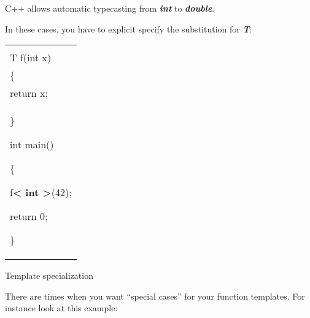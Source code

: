 \documentclass[
]{article}
\begin{document}
C++ allows automatic typecasting from \emph{\textbf{int}} to
\emph{\textbf{double}}.

In these cases, you have to explicit specify the substitution for
\emph{\textbf{T}}:

\begin{longtable}[]{@{}l@{}}
\toprule
\endhead
\begin{minipage}[t]{0.97\columnwidth}\raggedright
template \textless{} typename T \textgreater{}\\
T f(int x)\\
\{\\
return x;\\
\}

int main()

\{

f\textbf{\textless{} int \textgreater{}}(42);

return 0;

\}\strut
\end{minipage}\tabularnewline
\bottomrule
\end{longtable}

Template specialization

There are times when you want ``special cases'' for your function
templates. For instance look at this example:
\end{document}
